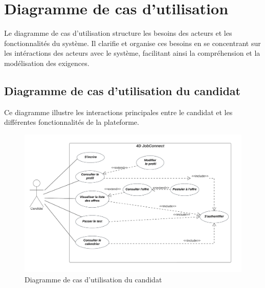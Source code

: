 \section{Diagramme de cas d’utilisation}

Le diagramme de cas d'utilisation structure les besoins des acteurs 
et les fonctionnalités du système. Il clarifie et organise 
ces besoins en se concentrant sur les intéractions des acteurs avec 
le système, facilitant ainsi la compréhension et la modélisation 
des exigences.
\subsection{Diagramme de cas d’utilisation du candidat}
Ce diagramme illustre les interactions principales entre le 
candidat et les différentes fonctionnalités de la plateforme. 

\begin{figure}[h]
    \centering
    \includegraphics[scale=0.16]{Images/uc cand.png} %
    \caption{Diagramme de cas d’utilisation du candidat}
    \label{fig:UCCandidat}
\end{figure}
\vspace{8cm}

